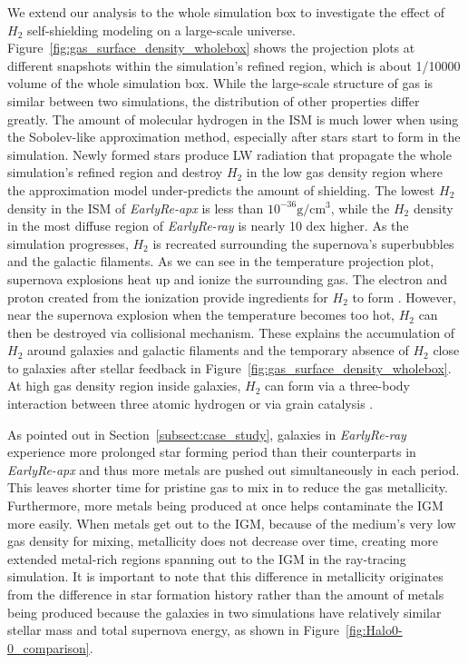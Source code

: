 \documentclass[linenumbers, twocolumn]{aastex631}
\begin{document}
We extend our analysis to the whole simulation box to investigate the effect of $H_{2}$ self-shielding modeling on a large-scale universe. Figure~\ref{fig:gas_surface_density_wholebox} shows the projection plots at different snapshots within the simulation's refined region, which is about 1/10000 volume of the whole simulation box. While the large-scale structure of gas is similar between two simulations, the distribution of other properties differ greatly. The amount of molecular hydrogen in the ISM is much lower when using the Sobolev-like approximation method, especially after stars start to form in the simulation. Newly formed stars produce LW radiation that propagate the whole simulation's refined region and destroy $H_{2}$ in the low gas density region where the approximation model under-predicts the amount of shielding. The lowest $H_{2}$ density in the ISM of \textit{EarlyRe-apx} is less than $10^{-36} \mathrm{g}/\mathrm{cm}^{3}$, while the $H_{2}$ density in the most diffuse region of \textit{EarlyRe-ray} is nearly 10 dex higher. As the simulation progresses, $H_{2}$ is recreated surrounding the supernova's superbubbles and the galactic filaments. As we can see in the temperature projection plot, supernova explosions heat up and ionize the surrounding gas. The electron and proton created from the ionization provide ingredients for $H_{2}$ to form \citep[see Table 1]{Galli+1998}. However, near the supernova explosion when the temperature becomes too hot, $H_{2}$ can then be destroyed via collisional mechanism. These explains the accumulation of $H_{2}$ around galaxies and galactic filaments and the temporary absence of $H_{2}$ close to galaxies after stellar feedback in Figure~\ref{fig:gas_surface_density_wholebox}. At high gas density region inside galaxies, $H_{2}$ can form via a three-body interaction between three atomic hydrogen \citep{Palla+1983} or via grain catalysis \citep{Gould+1963}.

As pointed out in Section~\ref{subsect:case_study}, galaxies in \textit{EarlyRe-ray} experience more prolonged star forming period than their counterparts in \textit{EarlyRe-apx} and thus more metals are pushed out simultaneously in each period. This leaves shorter time for pristine gas to mix in to reduce the gas metallicity. Furthermore, more metals being produced at once helps contaminate the IGM more easily. When metals get out to the IGM, because of the medium's very low gas density for mixing, metallicity does not decrease over time, creating more extended metal-rich regions spanning out to the IGM in the ray-tracing simulation. It is important to note that this difference in metallicity originates from the difference in star formation history rather than the amount of metals being produced because the galaxies in two simulations have relatively similar stellar mass and total supernova energy, as shown in Figure~\ref{fig:Halo0-0_comparison}.    
\end{document}
